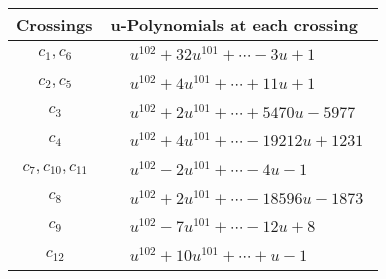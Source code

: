 \documentclass[1p]{elsarticle_modified}
\theoremstyle{definition}
\begin{document}
\begin{tabular}{m{50pt}|m{274pt}}
Crossings & \hspace{64pt}u-Polynomials at each crossing \\
\hline $$\begin{aligned}c_{1},c_{6}\end{aligned}$$&$\begin{aligned}
&u^{102}+32 u^{101}+\cdots-3 u+1
\end{aligned}$\\
\hline $$\begin{aligned}c_{2},c_{5}\end{aligned}$$&$\begin{aligned}
&u^{102}+4 u^{101}+\cdots+11 u+1
\end{aligned}$\\
\hline $$\begin{aligned}c_{3}\end{aligned}$$&$\begin{aligned}
&u^{102}+2 u^{101}+\cdots+5470 u-5977
\end{aligned}$\\
\hline $$\begin{aligned}c_{4}\end{aligned}$$&$\begin{aligned}
&u^{102}+4 u^{101}+\cdots-19212 u+1231
\end{aligned}$\\
\hline $$\begin{aligned}c_{7},c_{10},c_{11}\end{aligned}$$&$\begin{aligned}
&u^{102}-2 u^{101}+\cdots-4 u-1
\end{aligned}$\\
\hline $$\begin{aligned}c_{8}\end{aligned}$$&$\begin{aligned}
&u^{102}+2 u^{101}+\cdots-18596 u-1873
\end{aligned}$\\
\hline $$\begin{aligned}c_{9}\end{aligned}$$&$\begin{aligned}
&u^{102}-7 u^{101}+\cdots-12 u+8
\end{aligned}$\\
\hline $$\begin{aligned}c_{12}\end{aligned}$$&$\begin{aligned}
&u^{102}+10 u^{101}+\cdots+u-1
\end{aligned}$\\
\hline
\end{tabular}\\~\\
\end{document}
